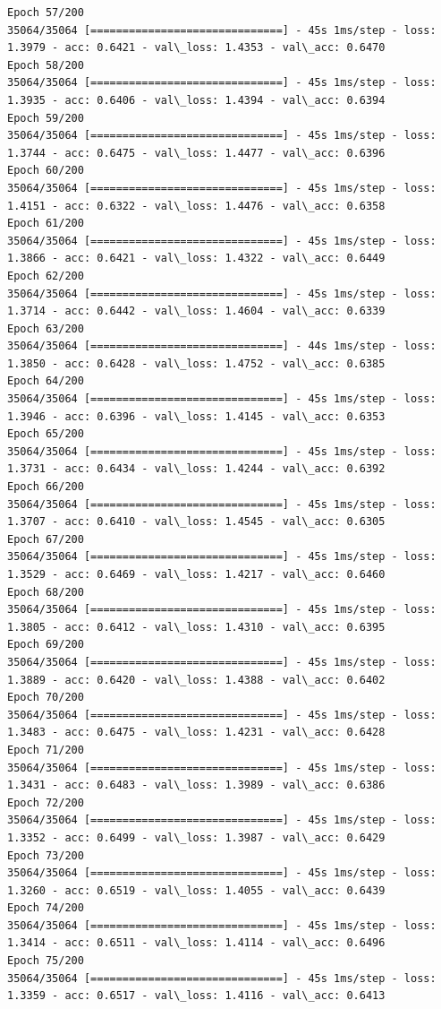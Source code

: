 \documentclass[11pt]{article}
\begin{document}
\begin{Verbatim}[commandchars=\\\{\}]
Epoch 57/200
35064/35064 [==============================] - 45s 1ms/step - loss: 1.3979 - acc: 0.6421 - val\_loss: 1.4353 - val\_acc: 0.6470
Epoch 58/200
35064/35064 [==============================] - 45s 1ms/step - loss: 1.3935 - acc: 0.6406 - val\_loss: 1.4394 - val\_acc: 0.6394
Epoch 59/200
35064/35064 [==============================] - 45s 1ms/step - loss: 1.3744 - acc: 0.6475 - val\_loss: 1.4477 - val\_acc: 0.6396
Epoch 60/200
35064/35064 [==============================] - 45s 1ms/step - loss: 1.4151 - acc: 0.6322 - val\_loss: 1.4476 - val\_acc: 0.6358
Epoch 61/200
35064/35064 [==============================] - 45s 1ms/step - loss: 1.3866 - acc: 0.6421 - val\_loss: 1.4322 - val\_acc: 0.6449
Epoch 62/200
35064/35064 [==============================] - 45s 1ms/step - loss: 1.3714 - acc: 0.6442 - val\_loss: 1.4604 - val\_acc: 0.6339
Epoch 63/200
35064/35064 [==============================] - 44s 1ms/step - loss: 1.3850 - acc: 0.6428 - val\_loss: 1.4752 - val\_acc: 0.6385
Epoch 64/200
35064/35064 [==============================] - 45s 1ms/step - loss: 1.3946 - acc: 0.6396 - val\_loss: 1.4145 - val\_acc: 0.6353
Epoch 65/200
35064/35064 [==============================] - 45s 1ms/step - loss: 1.3731 - acc: 0.6434 - val\_loss: 1.4244 - val\_acc: 0.6392
Epoch 66/200
35064/35064 [==============================] - 45s 1ms/step - loss: 1.3707 - acc: 0.6410 - val\_loss: 1.4545 - val\_acc: 0.6305
Epoch 67/200
35064/35064 [==============================] - 45s 1ms/step - loss: 1.3529 - acc: 0.6469 - val\_loss: 1.4217 - val\_acc: 0.6460
Epoch 68/200
35064/35064 [==============================] - 45s 1ms/step - loss: 1.3805 - acc: 0.6412 - val\_loss: 1.4310 - val\_acc: 0.6395
Epoch 69/200
35064/35064 [==============================] - 45s 1ms/step - loss: 1.3889 - acc: 0.6420 - val\_loss: 1.4388 - val\_acc: 0.6402
Epoch 70/200
35064/35064 [==============================] - 45s 1ms/step - loss: 1.3483 - acc: 0.6475 - val\_loss: 1.4231 - val\_acc: 0.6428
Epoch 71/200
35064/35064 [==============================] - 45s 1ms/step - loss: 1.3431 - acc: 0.6483 - val\_loss: 1.3989 - val\_acc: 0.6386
Epoch 72/200
35064/35064 [==============================] - 45s 1ms/step - loss: 1.3352 - acc: 0.6499 - val\_loss: 1.3987 - val\_acc: 0.6429
Epoch 73/200
35064/35064 [==============================] - 45s 1ms/step - loss: 1.3260 - acc: 0.6519 - val\_loss: 1.4055 - val\_acc: 0.6439
Epoch 74/200
35064/35064 [==============================] - 45s 1ms/step - loss: 1.3414 - acc: 0.6511 - val\_loss: 1.4114 - val\_acc: 0.6496
Epoch 75/200
35064/35064 [==============================] - 45s 1ms/step - loss: 1.3359 - acc: 0.6517 - val\_loss: 1.4116 - val\_acc: 0.6413

\end{Verbatim}
\end{document}
